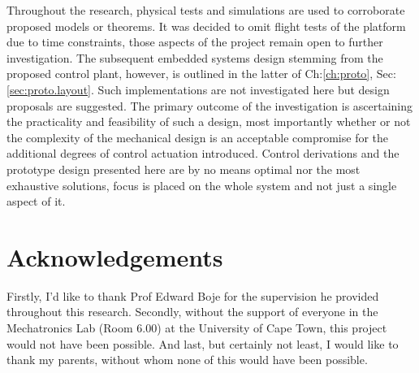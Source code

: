\documentclass[a4paper, 11pt, oneside, openright, parskip=full]{book}
\begin{document}
\par
Throughout the research, physical tests and simulations are used to corroborate proposed models or theorems. It was decided to omit flight tests of the platform due to time constraints, those aspects of the project remain open to further investigation. The subsequent embedded systems design stemming from the proposed control plant, however, is outlined in the latter of Ch:\ref{ch:proto}, Sec:\ref{sec:proto.layout}. Such implementations are not investigated here but design proposals are suggested. The primary outcome of the investigation is ascertaining the practicality and feasibility of such a design, most importantly whether or not the complexity of the mechanical design is an acceptable compromise for the additional degrees of control actuation introduced. Control derivations and the prototype design presented here are by no means optimal nor the most exhaustive solutions, focus is placed on the whole system and not just a single aspect of it.
\par
\chapter{Acknowledgements}		
\label{ch:ack}
Firstly, I'd like to thank Prof Edward Boje for the supervision he provided throughout this research. Secondly, without the support of everyone in the Mechatronics Lab (Room 6.00) at the University of Cape Town, this project would not have been possible. And last, but certainly not least, I would like to thank my parents, without whom none of this would have been possible. 
\end{document}

